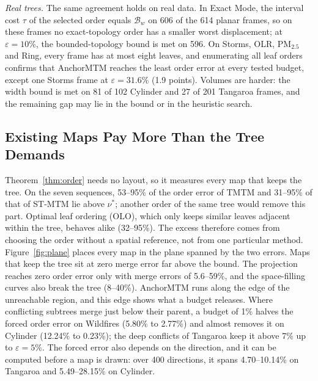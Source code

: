 \documentclass[preprint]{vgtc}   %
\begin{document}
\emph{Real trees.} The same agreement holds on real data. In Exact Mode, the interval cost $\tau$ of the selected order equals $\mathcal{B}_w$ on 606 of the 614 planar frames, so on these frames no exact-topology order has a smaller worst displacement; at $\varepsilon=10\%$, the bounded-topology bound is met on 596. On Storms, OLR, PM$_{2.5}$ and Ring, every frame has at most eight leaves, and enumerating all leaf orders confirms that AnchorMTM reaches the least order error at every tested budget, except one Storms frame at $\varepsilon=31.6\%$ (1.9 points). Volumes are harder: the width bound is met on 81 of 102 Cylinder and 27 of 201 Tangaroa frames, and the remaining gap may lie in the bound or in the heuristic search.

\subsection{Existing Maps Pay More Than the Tree Demands}\label{sec:eval-forced}
Theorem~\ref{thm:order} needs no layout, so it measures every map that keeps the tree. On the seven sequences, 53--95\% of the order error of TMTM and 31--95\% of that of ST-MTM lie above $\nu^*$; another order of the same tree would remove this part. Optimal leaf ordering (OLO), which only keeps similar leaves adjacent within the tree, behaves alike (32--95\%). The excess therefore comes from choosing the order without a spatial reference, not from one particular method. Figure~\ref{fig:plane} places every map in the plane spanned by the two errors. Maps that keep the tree sit at zero merge error far above the bound. The projection reaches zero order error only with merge errors of 5.6--59\%, and the space-filling curves also break the tree (8--40\%). AnchorMTM runs along the edge of the unreachable region, and this edge shows what a budget releases. Where conflicting subtrees merge just below their parent, a budget of 1\% halves the forced order error on Wildfires (5.80\% to 2.77\%) and almost removes it on Cylinder (12.24\% to 0.23\%); the deep conflicts of Tangaroa keep it above 7\% up to $\varepsilon=5\%$. The forced error also depends on the direction, and it can be computed before a map is drawn: over 400 directions, it spans 4.70--10.14\% on Tangaroa and 5.49--28.15\% on Cylinder.
\end{document}
